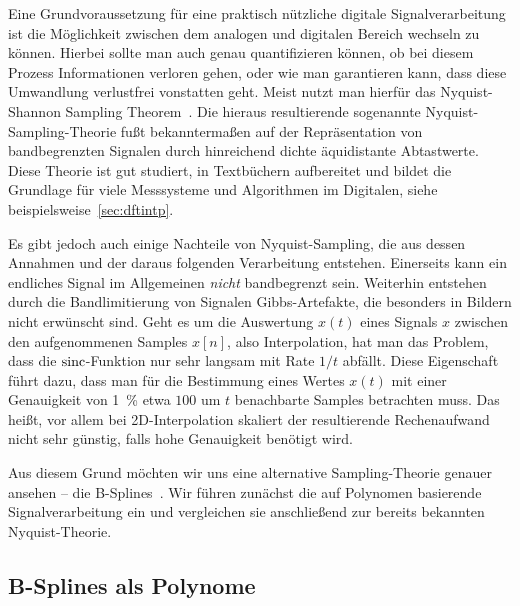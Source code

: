 %
Eine Grundvoraussetzung f\"ur eine praktisch n\"utzliche digitale Signalverarbeitung ist die M\"oglichkeit zwischen dem analogen und digitalen Bereich wechseln zu k\"onnen. Hierbei sollte man auch genau quantifizieren k\"onnen, ob bei diesem Prozess Informationen verloren gehen, oder wie man garantieren kann, dass diese Umwandlung verlustfrei vonstatten geht. Meist nutzt man hierf\"ur das Nyquist-Shannon Sampling Theorem~\cite[Kapitel~1.4.2]{proakis2013}. Die hieraus resultierende sogenannte Nyquist-Sampling-Theorie fu{\ss}t bekannterma{\ss}en auf der Repr\"asentation von bandbegrenzten Signalen durch hinreichend dichte \"aquidistante Abtastwerte. Diese Theorie ist gut studiert, in Textb\"uchern aufbereitet und bildet die Grundlage f\"ur viele Messsysteme und Algorithmen im Digitalen, siehe beispielsweise~\cref{sec:dftintp}.

Es gibt jedoch auch einige Nachteile von Nyquist-Sampling, die aus dessen Annahmen und der daraus folgenden Verarbeitung entstehen. Einerseits kann ein endliches Signal im Allgemeinen \emph{nicht} bandbegrenzt sein. Weiterhin entstehen durch die Bandlimitierung von Signalen Gibbs-Artefakte, die besonders in Bildern nicht erw\"unscht sind. Geht es um die Auswertung $x(t)$ eines Signals $x$ zwischen den aufgenommenen Samples $x[n]$, also Interpolation, hat man das Problem, dass die $\operatorname*{sinc}$-Funktion nur sehr langsam mit Rate $1/t$ abf\"allt. Diese Eigenschaft f\"uhrt dazu, dass man f\"ur die Bestimmung eines Wertes $x(t)$ mit einer Genauigkeit von \SI{1}{\percent} etwa $100$ um $t$ benachbarte Samples betrachten muss. Das hei{\ss}t, vor allem bei 2D-Interpolation skaliert der resultierende Rechenaufwand nicht sehr g\"unstig, falls hohe Genauigkeit ben\"otigt wird.

Aus diesem Grund m\"ochten wir uns eine alternative Sampling-Theorie genauer ansehen -- die B-Splines~\cite{unser1999splines_mag}. Wir f\"uhren zun\"achst die auf Polynomen basierende Signalverarbeitung ein und vergleichen sie anschlie{\ss}end zur bereits bekannten Nyquist-Theorie.

\subsection{B-Splines als Polynome}

